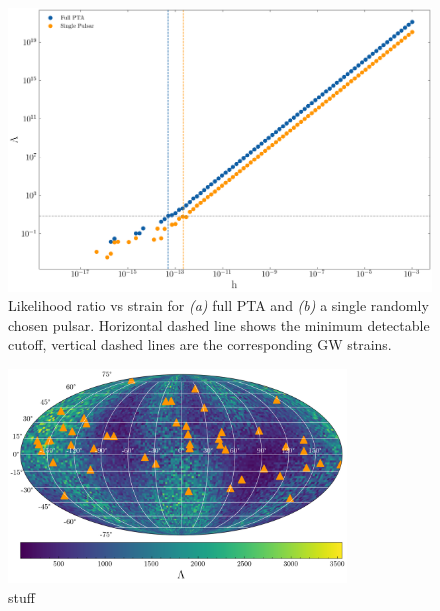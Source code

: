 \documentclass[fleqn,usenatbib,useAMS]{mnras}
\begin{document}
\begin{figure}
	\includegraphics[width=\columnwidth]{images/snr_canonical}
	\caption{Likelihood ratio vs strain for \textit{(a)} full PTA and \textit{(b)} a single randomly chosen pulsar. Horizontal dashed line shows the minimum detectable cutoff, vertical dashed lines are the corresponding GW strains.}
	\label{fig:SNR}
\end{figure}





\begin{figure}
	\includegraphics[width=0.8\textwidth]{images/snr_mollewide}
	\caption{stuff}
	\label{fig:mollewide}
\end{figure}




%
%
%
\end{document}

